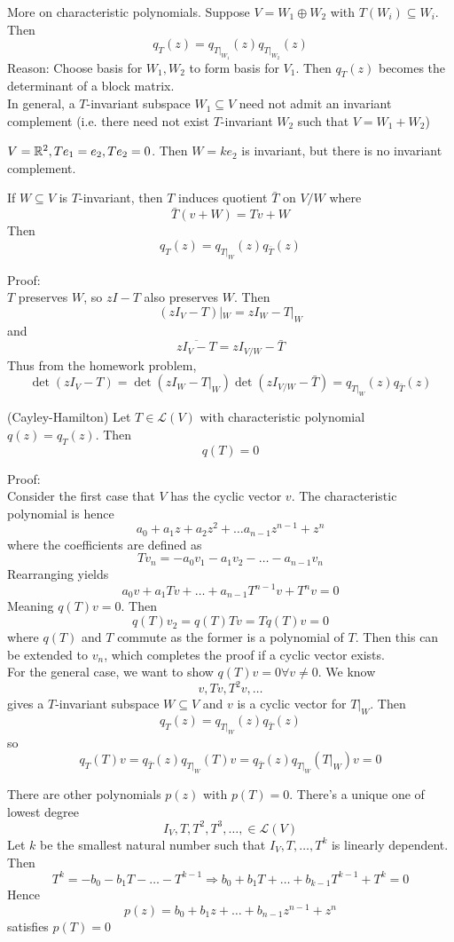 \documentclass[12pt]{article}
\begin{document}
More on characteristic polynomials. Suppose $V=W_1 \oplus W_2$ with $T(W_i)\subseteq W_i$. Then
$$q_T(z) = q_{T|_{W_1}}(z)q_{T|_{W_2}}(z)$$
Reason: Choose basis for $W_1,W_2$ to form basis for $V_1$. Then $q_T(z)$ becomes the determinant of a block matrix. \\
In general, a $T$-invariant subspace $W_1\subseteq V$ need not admit an invariant complement (i.e. there need not exist $T$-invariant $W_2$ such that $V=W_1+W_2$)

\begin{ex}
	$V=\mathbb{R}^2,Te_1=e_2,Te_2=0$. Then $W=ke_2$ is invariant, but there is no invariant complement.
\end{ex}

If $W\subseteq V$ is $T$-invariant, then $T$ induces quotient $\bar{T}$ on $V/W$ where
$$\bar{T}(v+W) = Tv+W$$
Then
$$q_T(z) = q_{T|_W}(z)q_{\bar{T}}(z)$$

Proof: \\
$T$ preserves $W$, so $zI-T$ also preserves $W$. Then
$$(zI_V-T)|_W = zI_W-T|_W$$
and
$$\overline{zI_V-T} = zI_{V/W}-\bar{T}$$
Thus from the homework problem,
$$\det(zI_V-T) = \det(zI_W-T|_W)\det(zI_{V/W}-\bar{T}) = q_{T|_W}(z)q_{\bar{T}}(z)$$

\begin{thm}
	(Cayley-Hamilton) Let $T\in\mathcal L(V)$ with characteristic polynomial $q(z)=q_T(z)$. Then
	$$q(T) = 0$$
\end{thm}

Proof: \\
Consider the first case that $V$ has the cyclic vector $v$. The characteristic polynomial is hence
$$a_0 + a_1z + a_2z^2 +\dots a_{n-1}z^{n-1} + z^n$$
where the coefficients are defined as
$$Tv_n = -a_0v_1 - a_1v_2 - \dots - a_{n-1}v_n$$
Rearranging yields
$$a_0v + a_1Tv +\dots + a_{n-1}T^{n-1}v + T^nv = 0$$
Meaning $q(T)v=0$. Then
$$q(T)v_2 = q(T)Tv = Tq(T)v = 0$$
where $q(T)$ and $T$ commute as the former is a polynomial of $T$. Then this can be extended to $v_n$, which completes the proof if a cyclic vector exists. \\
For the general case, we want to show $q(T)v=0\forall v\neq0$. We know
$$v,Tv,T^2v,\dots$$
gives a $T$-invariant subspace $W\subseteq V$ and $v$ is a cyclic vector for $T|_W$. Then
$$q_T(z) = q_{T|_W}(z)q_{\bar{T}}(z)$$
so
$$q_T(T)v = q_{\bar{T}}(z)q_{T|_W}(T)v = q_{\bar{T}}(z)q_{T|_W}(T|_W)v = 0$$

There are other polynomials $p(z)$ with $p(T)=0$. There's a unique one of lowest degree
$$I_V,T,T^2,T^3,\dots,\in\mathcal L(V)$$
Let $k$ be the smallest natural number such that $I_V, T,\dots,T^k$ is linearly dependent. Then
$$T^k = -b_0 - b_1T-\dots-T^{k-1} \Rightarrow b_0 + b_1T +\dots+b_{k-1}T^{k-1} + T^k = 0$$
Hence
$$p(z) = b_0 + b_1z +\dots+ b_{n-1}z^{n-1} + z^n$$
satisfies $p(T)=0$
\end{document}
